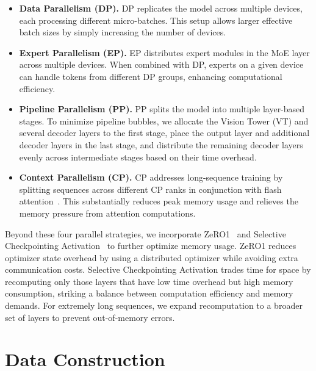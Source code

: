 \documentclass{article}
\newcommand{\citep}[1]{\parencite{#1}}
\begin{document}
\begin{itemize}
    \item \textbf{Data Parallelism (DP).} 
    DP replicates the model across multiple devices, each processing different micro-batches. 
    This setup allows larger effective batch sizes by simply increasing the number of devices.

    \item \textbf{Expert Parallelism (EP).}
    EP distributes expert modules in the MoE layer across multiple devices. 
    When combined with DP, experts on a given device can handle tokens from different DP groups, enhancing computational efficiency.

    \item \textbf{Pipeline Parallelism (PP).}
    PP splits the model into multiple layer-based stages. To minimize pipeline bubbles, we allocate the Vision Tower (VT) and several decoder layers to the first stage, place the output layer and additional decoder layers in the last stage, and distribute the remaining decoder layers evenly across intermediate stages based on their time overhead.

    \item \textbf{Context Parallelism (CP).}
    CP addresses long-sequence training by splitting sequences across different CP ranks in conjunction with flash attention~\citep{dao2022flashattentionfastmemoryefficientexact}. 
    This substantially reduces peak memory usage and relieves the memory pressure from attention computations.
\end{itemize}


Beyond these four parallel strategies, we incorporate ZeRO1~\citep{rajbhandari2020zero} and Selective Checkpointing Activation~\citep{chen2016trainingdeepnetssublinear, korthikanti2022reducingactivationrecomputationlarge} to further optimize memory usage. ZeRO1 reduces optimizer state overhead by using a distributed optimizer while avoiding extra communication costs. Selective Checkpointing Activation trades time for space by recomputing only those layers that have low time overhead but high memory consumption, striking a balance between computation efficiency and memory demands. For extremely long sequences, we expand recomputation to a broader set of layers to prevent out-of-memory errors.


\section{Data Construction}
\end{document}

